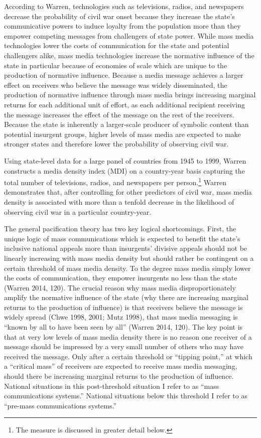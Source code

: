 \documentclass[11pt,article,oneside]{memoir}
\begin{document}
According to Warren, technologies such as televisions, radios, and
newspapers decrease the probability of civil war onset because they
increase the state's communicative powers to induce loyalty from the
population more than they empower competing messages from challengers of
state power. While mass media technologies lower the costs of
communication for the state and potential challengers alike, mass media
technologies increase the normative influence of the state in particular
because of economies of scale which are unique to the production of
normative influence. Because a media message achieves a larger effect on
receivers who believe the message was widely disseminated, the
production of normative influence through mass media brings increasing
marginal returns for each additional unit of effort, as each additional
recipient receiving the message increases the effect of the message on
the rest of the receivers. Because the state is inherently a
larger-scale producer of symbolic content than potential insurgent
groups, higher levels of mass media are expected to make stronger states
and therefore lower the probability of observing civil war.

Using state-level data for a large panel of countries from 1945 to 1999,
Warren constructs a media density index (MDI) on a country-year basis
capturing the total number of televisions, radios, and newspapers per
person.\footnote{The measure is discussed in greater detail below.}
Warren demonstrates that, after controlling for other predictors of
civil war, mass media density is associated with more than a tenfold
decrease in the likelihood of observing civil war in a particular
country-year.

The general pacification theory has two key logical shortcomings. First,
the unique logic of mass communications which is expected to benefit the
state's inclusive national appeals more than insurgents' divisive
appeals should not be linearly increasing with mass media density but
should rather be contingent on a certain threshold of mass media
density. To the degree mass media simply lower the costs of
communication, they empower insurgents no less than the state (Warren
2014, 120). The crucial reason why mass media disproportionately amplify
the normative influence of the state (why there are increasing marginal
returns to the production of influence) is that receivers believe the
message is widely spread (Chwe 1998, 2001; Mutz 1998), that mass media
messaging is ``known by all to have been seen by all'' (Warren 2014,
120). The key point is that at very low levels of mass media density
there is no reason one receiver of a message should be impressed by a
very small number of others who may have received the message. Only
after a certain threshold or ``tipping point,'' at which a ``critical
mass'' of receivers are expected to receive mass media messaging, should
there be increasing marginal returns to the production of influence.
National situations in this post-threshold situation I refer to as
``mass communications systems.'' National situations below this
threshold I refer to as ``pre-mass communications systems.''
\end{document}
